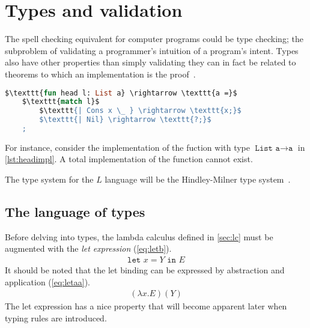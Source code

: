 \documentclass[11pt,oneside,a4paper]{report}
\begin{document}
\section{Types and validation}
The spell checking equivalent for computer programs could be type checking; the subproblem of validating a programmer's intuition of a program's intent.
Types also have other properties than simply validating they can in fact be related to theorems to which an implementation is the proof~\cite{howard1980formulae}.
\begin{lstlisting}[language=ML,caption={Head implementation},label={lst:headimpl},mathescape=true]
$\texttt{fun head l: List a} \rightarrow \texttt{a =}$
    $\texttt{match l}$
        $\texttt{| Cons x \_ } \rightarrow \texttt{x;}$
        $\texttt{| Nil} \rightarrow \texttt{?;}$
    ;
\end{lstlisting}
For instance, consider the implementation of the fuction with type $\texttt{List a} \rightarrow \texttt{a}$ in \autoref{lst:headimpl}.
A total implementation of the function cannot exist.

The type system for the $L$ language will be the Hindley-Milner type system~\cite{hindley1969principal,milner1978theory}.

\subsection{The language of types}
Before delving into types, the lambda calculus defined in \autoref{sec:lc} must be augmented with the \textit{let expression} (\autoref{eq:letb}).
\begin{align}
	\texttt{let } x = Y \texttt{ in } E
	\label{eq:letb}
\end{align}
It should be noted that the let binding can be expressed by abstraction and application (\autoref{eq:letaa}).
\begin{align}
	(\lambda x . E) (Y)
	\label{eq:letaa}
\end{align}
The let expression has a nice property that will become apparent later when typing rules are introduced.
\end{document}
